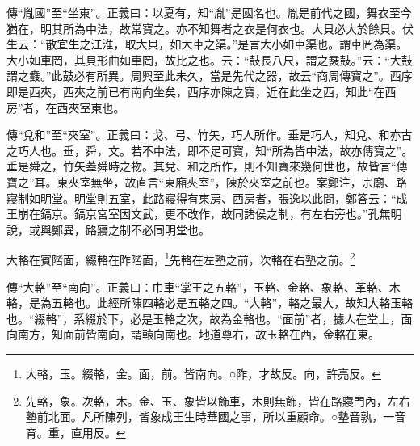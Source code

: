 {\noindent\zhuan{}\fzbyks 傳“胤國”至“坐東”。正義曰：以夏有，知“胤”是國名也。胤是前代之國，舞衣至今猶在，明其所為中法，故常寶之。亦不知舞者之衣是何衣也。大貝必大於餘貝。伏生云：“散宜生之江淮，取大貝，如大車之渠。”是言大小如車渠也。謂車罔為渠。大小如車罔，其貝形曲如車罔，故比之也。云：“鼓長八尺，謂之鼖鼓。”云：“大鼓謂之鼖。”此鼓必有所異。周興至此未久，當是先代之器，故云“商周傳寶之”。西序即是西夾，西夾之前已有南向坐矣，西序亦陳之寶，近在此坐之西，知此“在西房”者，在西夾室東也。 \par}

{\noindent\zhuan{}\fzbyks 傳“兌和”至“夾室”。正義曰：戈、弓、竹矢，巧人所作。垂是巧人，知兌、和亦古之巧人也。垂，舜，文。若不中法，即不足可寶，知“所為皆中法，故亦傳寶之”。垂是舜之，竹矢蓋舜時之物。其兌、和之所作，則不知寶來幾何世也，故皆言“傳寶之”耳。東夾室無坐，故直言“東廂夾室”，陳於夾室之前也。案鄭注，宗廟、路寢制如明堂。明堂則五室，此路寢得有東房、西房者，張逸以此問，鄭答云：“成王崩在鎬京。鎬京宮室因文武，更不改作，故同諸侯之制，有左右旁也。”孔無明說，或與鄭異，路寢之制不必同明堂也。 \par}

大輅在賓階面，綴輅在阼階面，\footnote{大輅，玉。綴輅，金。面，前。皆南向。○阼，才故反。向，許亮反。}先輅在左塾之前，次輅在右塾之前。\footnote{先輅，象。次輅，木。金、玉、象皆以飾車，木則無飾，皆在路寢門內，左右塾前北面。凡所陳列，皆象成王生時華國之事，所以重顧命。○塾音孰，一音育。重，直用反。}

{\noindent\zhuan{}\fzbyks 傳“大輅”至“南向”。正義曰：巾車“掌王之五輅”，玉輅、金輅、象輅、革輅、木輅，是為五輅也。此經所陳四輅必是五輅之四。“大輅”，輅之最大，故知大輅玉輅也。“綴輅”，系綴於下，必是玉輅之次，故為金輅也。“面前”者，據人在堂上，面向南方，知面前皆南向，謂轅向南也。地道尊右，故玉輅在西，金輅在東。 \par}

